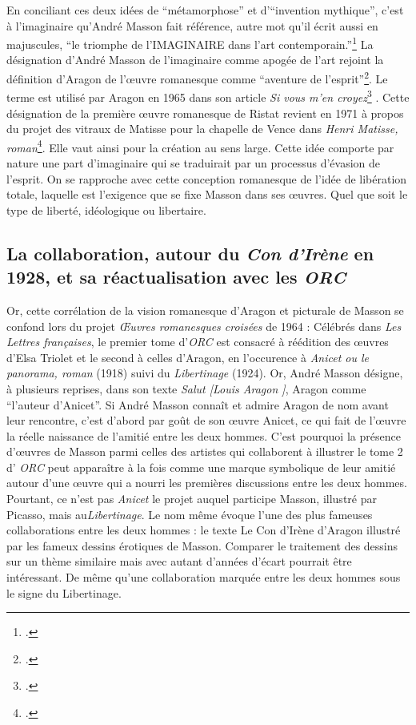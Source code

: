 En conciliant ces deux idées de \enquote{métamorphose} et d’\enquote{invention mythique}, c’est à l’imaginaire qu’André Masson fait référence, autre mot qu’il écrit aussi en majuscules, \enquote{le triomphe de l’IMAGINAIRE dans l’art contemporain.}\footcite[p19]{rebelle} La désignation d’André Masson de l’imaginaire comme apogée de l’art rejoint la définition d’Aragon de l’\oe{}uvre romanesque comme \enquote{aventure de l’esprit}\footcite{sivous}. Le terme est utilisé par Aragon en 1965 dans son article \emph{Si vous m'en croyez}\footcite[p1]{sivous} . Cette désignation de la première \oe{}uvre romanesque de Ristat revient en 1971 à propos du projet des vitraux de Matisse pour la chapelle de Vence dans \emph{Henri Matisse, roman}\footcite[p643]{aragonmatisse}. Elle vaut ainsi pour la création au sens large. Cette idée comporte par nature une part d’imaginaire qui se traduirait par un processus d’évasion de l’esprit. On se rapproche avec cette conception romanesque de l’idée de libération totale, laquelle est l’exigence que se fixe Masson dans ses \oe{}uvres. Quel que soit le type de liberté, idéologique ou libertaire. 

\subsection{La collaboration, autour du \textit{Con d'Irène} en 1928, et sa réactualisation avec les \textit{ORC}}

Or, cette corrélation de la vision romanesque d’Aragon et picturale de Masson se confond lors du projet \emph{\OE{}uvres romanesques croisées} de 1964 : Célébrés dans \emph{Les Lettres françaises}, le premier tome d’\emph{ORC} est consacré à réédition des \oe{}uvres d’Elsa Triolet et le second à celles d’Aragon, en l’occurence à \emph{Anicet ou le panorama, roman} (1918) suivi du \emph{Libertinage} (1924). Or, André Masson désigne, à plusieurs reprises, dans son texte \emph{Salut [Louis Aragon ]}, Aragon comme \enquote{l’auteur d’Anicet}. Si André Masson connaît et admire Aragon de nom avant leur rencontre, c’est d’abord par goût de son \oe{}uvre Anicet, ce qui fait de l’\oe{}uvre la réelle naissance de l’amitié entre les deux hommes. C’est pourquoi la présence d’\oe{}uvres de Masson parmi celles des artistes qui collaborent à illustrer le tome 2 d’ \emph{ORC} peut apparaître à la fois comme une marque symbolique de leur amitié autour d’une \oe{}uvre qui a nourri les premières discussions entre les deux hommes. Pourtant, ce n’est pas \emph{Anicet} le projet auquel participe Masson, illustré par Picasso, mais au\emph{Libertinage}. Le nom même évoque l’une des plus fameuses collaborations entre les deux hommes : le texte Le Con d’Irène d’Aragon illustré par les fameux dessins érotiques de Masson. Comparer le traitement des dessins sur un thème similaire mais avec autant d’années d’écart pourrait être intéressant. De même qu’une collaboration marquée entre les deux hommes sous le signe du Libertinage. 

